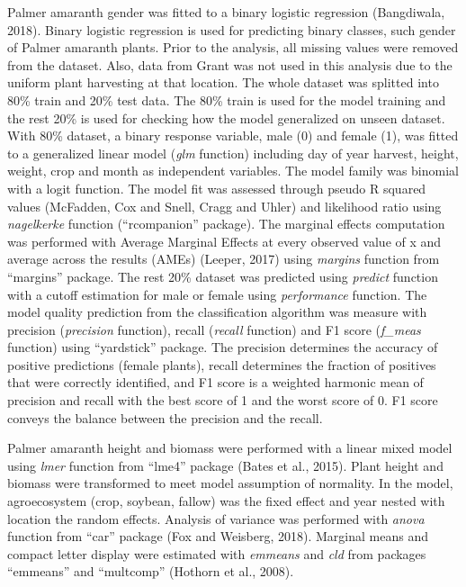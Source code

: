 \documentclass[utf8]{frontiersSCNS}
\begin{document}
Palmer amaranth gender was fitted to a binary logistic regression
(Bangdiwala, 2018). Binary logistic regression is used for predicting
binary classes, such gender of Palmer amaranth plants. Prior to the
analysis, all missing values were removed from the dataset. Also, data
from Grant was not used in this analysis due to the uniform plant
harvesting at that location. The whole dataset was splitted into 80\%
train and 20\% test data. The 80\% train is used for the model training
and the rest 20\% is used for checking how the model generalized on
unseen dataset. With 80\% dataset, a binary response variable, male (0)
and female (1), was fitted to a generalized linear model (\emph{glm}
function) including day of year harvest, height, weight, crop and month
as independent variables. The model family was binomial with a logit
function. The model fit was assessed through pseudo R squared values
(McFadden, Cox and Snell, Cragg and Uhler) and likelihood ratio using
\emph{nagelkerke} function (``rcompanion'' package). The marginal
effects computation was performed with Average Marginal Effects at every
observed value of x and average across the results (AMEs) (Leeper, 2017)
using \emph{margins} function from ``margins'' package. The rest 20\%
dataset was predicted using \emph{predict} function with a cutoff
estimation for male or female using \emph{performance} function. The
model quality prediction from the classification algorithm was measure
with precision (\emph{precision} function), recall (\emph{recall}
function) and F1 score (\emph{f\_meas} function) using ``yardstick''
package. The precision determines the accuracy of positive predictions
(female plants), recall determines the fraction of positives that were
correctly identified, and F1 score is a weighted harmonic mean of
precision and recall with the best score of 1 and the worst score of 0.
F1 score conveys the balance between the precision and the recall.

Palmer amaranth height and biomass were performed with a linear mixed
model using \emph{lmer} function from ``lme4'' package (Bates et al.,
2015). Plant height and biomass were transformed to meet model
assumption of normality. In the model, agroecosystem (crop, soybean,
fallow) was the fixed effect and year nested with location the random
effects. Analysis of variance was performed with \emph{anova} function
from ``car'' package (Fox and Weisberg, 2018). Marginal means and
compact letter display were estimated with \emph{emmeans} and \emph{cld}
from packages ``emmeans'' and ``multcomp'' (Hothorn et al., 2008).
\end{document}
